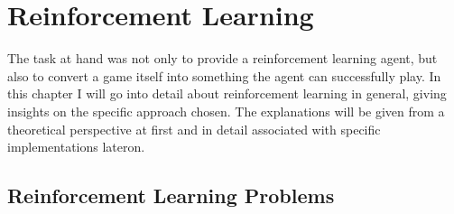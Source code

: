 \chapter{Reinforcement Learning}

\label{ch:RL} 

\newcommand{\inlinecode}[1]{\colorbox{evenmorelightgray}{\lstinline[basicstyle=\ttfamily\color{black}]{#1}}}


The task at hand was not only to provide a reinforcement learning agent, but also to convert a game itself into something the agent can successfully play. In this chapter I will go into detail about reinforcement learning in general, giving insights on the specific approach chosen. The explanations will be given from a theoretical perspective at first and in detail associated with specific implementations lateron.


\section{Reinforcement Learning Problems}

